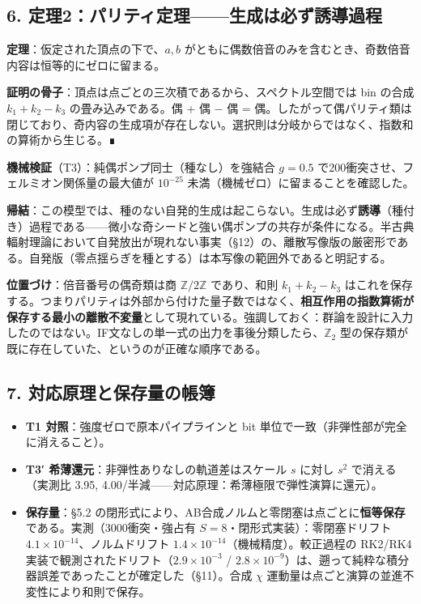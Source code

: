 \documentclass[
  a4paper,
]{ltjsarticle}
\providecommand{\tightlist}{%
  \setlength{\itemsep}{0pt}\setlength{\parskip}{0pt}}
\begin{document}
\subsection{6.
定理2：パリティ定理------生成は必ず誘導過程}\label{ux5b9aux74062ux30d1ux30eaux30c6ux30a3ux5b9aux7406ux751fux6210ux306fux5fc5ux305aux8a98ux5c0eux904eux7a0b}

\textbf{定理}：仮定された頂点の下で、\(a, b\)
がともに偶数倍音のみを含むとき、奇数倍音内容は恒等的にゼロに留まる。

\textbf{証明の骨子}：頂点は点ごとの三次積であるから、スペクトル空間では
bin の合成 \(k_1 + k_2 - k_3\) の畳み込みである。偶 + 偶 − 偶 =
偶。したがって偶パリティ類は閉じており、奇内容の生成項が存在しない。選択則は分岐からではなく、指数和の算術から生じる。∎

\textbf{機械検証}（T3）：純偶ポンプ同士（種なし）を強結合 \(g=0.5\)
で200衝突させ、フェルミオン関係量の最大値が \(10^{-25}\)
未満（機械ゼロ）に留まることを確認した。

\textbf{帰結}：この模型では、種のない自発的生成は起こらない。生成は必ず\textbf{誘導}（種付き）過程である------微小な奇シードと強い偶ポンプの共存が条件になる。半古典輻射理論において自発放出が現れない事実（§12）の、離散写像版の厳密形である。自発版（零点揺らぎを種とする）は本写像の範囲外であると明記する。

\textbf{位置づけ}：倍音番号の偶奇類は商 \(\mathbb{Z}/2\mathbb{Z}\)
であり、和則 \(k_1+k_2-k_3\)
はこれを保存する。つまりパリティは外部から付けた量子数ではなく、\textbf{相互作用の指数算術が保存する最小の離散不変量}として現れている。強調しておく：群論を設計に入力したのではない。IF文なしの単一式の出力を事後分類したら、\(\mathbb{Z}_2\)
型の保存類が既に存在していた、というのが正確な順序である。

\subsection{7.
対応原理と保存量の帳簿}\label{ux5bfeux5fdcux539fux7406ux3068ux4fddux5b58ux91cfux306eux5e33ux7c3f}

\begin{itemize}
\tightlist
\item
  \textbf{T1 対照}：強度ゼロで原本パイプラインと bit
  単位で一致（非弾性部が完全に消えること）。
\item
  \textbf{T3′ 希薄還元}：非弾性ありなしの軌道差はスケール \(s\) に対し
  \(s^2\) で消える（実測比 3.95,
  4.00/半減------対応原理：希薄極限で弾性演算に還元）。
\item
  \textbf{保存量}：§5.2
  の閉形式により、AB合成ノルムと零閉塞は点ごとに\textbf{恒等保存}である。実測（3000衝突・強占有
  \(S=8\)・閉形式実装）：零閉塞ドリフト
  \(4.1\times10^{-14}\)、ノルムドリフト
  \(1.4\times10^{-14}\)（機械精度）。較正過程の RK2/RK4
  実装で観測されたドリフト（\(2.9\times10^{-3}\) /
  \(2.8\times10^{-9}\)）は、遡って純粋な積分器誤差であったことが確定した（§11）。合成
  \(\chi\) 運動量は点ごと演算の並進不変性により和則で保存。
\end{itemize}
\end{document}
